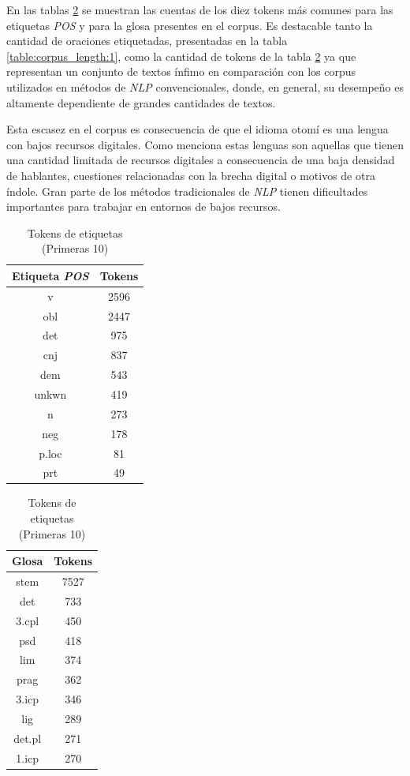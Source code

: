 \documentclass[letterpaper,12pt,oneside]{book}
\theoremstyle{definition}
\begin{document}
En las tablas \ref{table_pos_gloss_tokens} se muestran las cuentas de los diez tokens más comunes para las etiquetas \textit{POS} y para la glosa presentes en el corpus. Es destacable tanto la cantidad de oraciones etiquetadas, presentadas en la tabla \ref{table:corpus_length:1}, como la cantidad de tokens de la tabla \ref{table_pos_gloss_tokens} ya que representan un conjunto de textos ínfimo en comparación con los corpus utilizados en métodos de \textit{NLP} convencionales, donde, en general, su desempeño es altamente dependiente de grandes cantidades de textos.

Esta escasez en el corpus es consecuencia de que el idioma otomí es una lengua con bajos recursos digitales. Como menciona \citet{vasquesextraccion} estas lenguas son aquellas que tienen una cantidad limitada de recursos digitales a consecuencia de una baja densidad de hablantes, cuestiones relacionadas con la brecha digital o motivos de otra índole. Gran parte de los métodos tradicionales de \textit{NLP} tienen dificultades importantes para trabajar en entornos de bajos recursos.

\begin{table}[h]
	\centering
	\begin{tabular}{|c | c|}\hline
		\textbf{Etiqueta \textit{POS}} & \textbf{Tokens} \\ \hline
		v & 2596 \\
		obl & 2447 \\
		det & 975 \\
		cnj & 837 \\
		dem & 543 \\
		unkwn & 419 \\
		n & 273 \\
		neg & 178 \\
		p.loc & 81 \\
		prt & 49 \\\hline
	\end{tabular}
	\quad
	\begin{tabular}{|c | c|}\hline                            
		\textbf{Glosa} & \textbf{Tokens} \\ \hline
		stem & 7527 \\
		det & 733 \\
		3.cpl & 450 \\
		psd & 418 \\
		lim & 374 \\
		prag & 362 \\
		3.icp & 346 \\
		lig & 289 \\
		det.pl & 271 \\
		1.icp & 270 \\\hline
	\end{tabular}
	\caption{Tokens de etiquetas (Primeras 10)}
	\label{table_pos_gloss_tokens}
\end{table}
\end{document}
